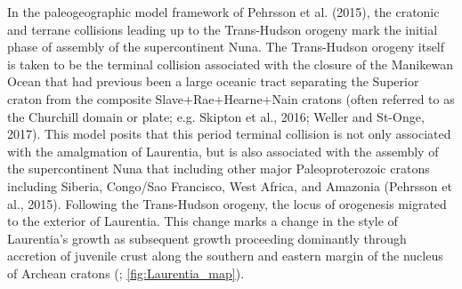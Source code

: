 \documentclass[11pt,letterpaper]{article}
\begin{document}
In the paleogeographic model framework of Pehrsson et al. (2015), the cratonic and terrane collisions leading up to the Trans-Hudson orogeny mark the initial phase of assembly of the supercontinent Nuna. The Trans-Hudson orogeny itself is taken to be the terminal collision associated with the closure of the Manikewan Ocean that had previous been a large oceanic tract separating the Superior craton from the composite Slave+Rae+Hearne+Nain cratons (often referred to as the Churchill domain or plate; e.g. Skipton et al., 2016; Weller and St-Onge, 2017). This model posits that this period terminal collision is not only associated with the amalgmation of Laurentia, but is also associated with the assembly of the supercontinent Nuna that including other major Paleoproterozoic cratons including Siberia, Congo/Sao Francisco, West Africa, and Amazonia (Pehrsson et al., 2015). Following the Trans-Hudson orogeny, the locus of orogenesis migrated to the exterior of Laurentia. This change marks a change in the style of Laurentia's growth as subsequent growth proceeding dominantly through accretion of juvenile crust along the southern and eastern margin of the nucleus of Archean cratons (\citealp{Whitmeyer2007a}; \ref{fig:Laurentia_map}). 

\end{document}
